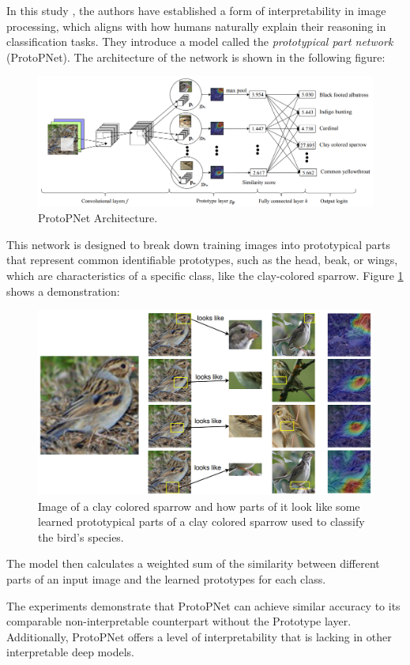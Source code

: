 In this study \cite{NEURIPS2019_adf7ee2d}, the authors have established a form of interpretability in image processing, which aligns with how humans naturally explain their reasoning in classification tasks.
They introduce a model called the \textit{prototypical part network} (ProtoPNet). The architecture of the network is shown in the following figure:

\begin{figure}[H]
    \centering
    \includegraphics[width=0.9\linewidth]{pics/ProtoPNet_architecture.png}
    \caption[ProtoPNet Architecture.]{ProtoPNet Architecture.\cite{NEURIPS2019_adf7ee2d}}
\end{figure}

This network is designed to break down training images into prototypical parts that represent common identifiable prototypes, such as the head, beak, or wings, which are characteristics of a specific class, like the clay-colored sparrow. Figure \ref{fig:sparrow} shows a demonstration:

\begin{figure}[H]
    \centering
    \includegraphics[width=0.7\linewidth]{pics/thisthat.png}
    \caption[Learned prototypical parts of a clay colored sparrow.]{Image of a clay colored sparrow and how parts of it look like some learned prototypical parts of a clay colored sparrow used to classify the bird’s species.\cite{NEURIPS2019_adf7ee2d}}
    \label{fig:sparrow}
\end{figure}

The model then calculates a weighted sum of the similarity between different parts of an input image and the learned prototypes for each class. 

The experiments demonstrate that ProtoPNet can achieve similar accuracy to its comparable non-interpretable counterpart without the Prototype layer. Additionally, ProtoPNet offers a level of interpretability that is lacking in other interpretable deep models.
